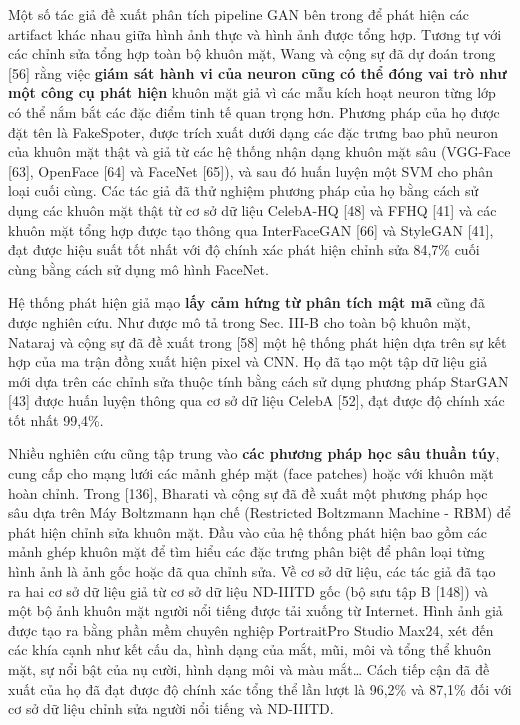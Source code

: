 \documentclass{article}
\begin{document}
Một số tác giả đề xuất phân tích pipeline GAN bên trong để phát hiện các artifact khác nhau giữa hình ảnh thực và hình ảnh được tổng hợp. Tương tự với các chỉnh sửa tổng hợp toàn bộ khuôn mặt, Wang và cộng sự đã dự đoán trong [56] rằng việc \textbf{giám sát hành vi của neuron cũng có thể đóng vai trò như một công cụ phát hiện} khuôn mặt giả vì các mẫu kích hoạt neuron từng lớp có thể nắm bắt các đặc điểm tinh tế quan trọng hơn. Phương pháp của họ được đặt tên là FakeSpoter, được trích xuất dưới dạng các đặc trưng bao phủ neuron của khuôn mặt thật và giả từ các hệ thống nhận dạng khuôn mặt sâu (VGG-Face [63], OpenFace [64] và FaceNet [65]), và sau đó huấn luyện một SVM cho phân loại cuối cùng. Các tác giả đã thử nghiệm phương pháp của họ bằng cách sử dụng các khuôn mặt thật từ cơ sở dữ liệu CelebA-HQ [48] và FFHQ [41] và các khuôn mặt tổng hợp được tạo thông qua InterFaceGAN [66] và StyleGAN [41], đạt được hiệu suất tốt nhất với độ chính xác phát hiện chỉnh sửa 84,7\% cuối cùng bằng cách sử dụng mô hình FaceNet.

Hệ thống phát hiện giả mạo \textbf{lấy cảm hứng từ phân tích mật mã} cũng đã được nghiên cứu. Như được mô tả trong Sec. III-B cho toàn bộ khuôn mặt, Nataraj và cộng sự đã đề xuất trong [58] một hệ thống phát hiện dựa trên sự kết hợp của ma trận đồng xuất hiện pixel và CNN. Họ đã tạo một tập dữ liệu giả mới dựa trên các chỉnh sửa thuộc tính bằng cách sử dụng phương pháp StarGAN [43] được huấn luyện thông qua cơ sở dữ liệu CelebA [52], đạt được độ chính xác tốt nhất 99,4\%.

Nhiều nghiên cứu cũng tập trung vào \textbf{các phương pháp học sâu thuần túy}, cung cấp cho mạng lưới các mảnh ghép mặt (face patches) hoặc với khuôn mặt hoàn chỉnh. Trong [136], Bharati và cộng sự đã đề xuất một phương pháp học sâu dựa trên Máy Boltzmann hạn chế (Restricted Boltzmann Machine - RBM) để phát hiện chỉnh sửa khuôn mặt. Đầu vào của hệ thống phát hiện bao gồm các mảnh ghép khuôn mặt để tìm hiểu các đặc trưng phân biệt để phân loại từng hình ảnh là ảnh gốc hoặc đã qua chỉnh sửa. Về cơ sở dữ liệu, các tác giả đã tạo ra hai cơ sở dữ liệu giả từ cơ sở dữ liệu ND-IIITD gốc (bộ sưu tập B [148]) và một bộ ảnh khuôn mặt người nổi tiếng được tải xuống từ Internet. Hình ảnh giả được tạo ra bằng phần mềm chuyên nghiệp PortraitPro Studio Max24, xét đến các khía cạnh như kết cấu da, hình dạng của mắt, mũi, môi và tổng thể khuôn mặt, sự nổi bật của nụ cười, hình dạng môi và màu mắt… Cách tiếp cận đã đề xuất của họ đã đạt được độ chính xác tổng thể lần lượt là 96,2\% và 87,1\% đối với cơ sở dữ liệu chỉnh sửa người nổi tiếng và ND-IIITD.
\end{document}
